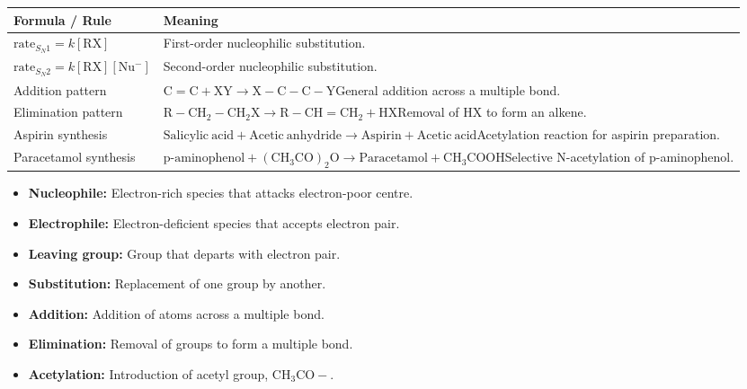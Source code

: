 \documentclass[12pt,a4paper]{article}
\renewcommand{\arraystretch}{1.45}
\begin{document}
\begin{tcolorbox}[formulabox, title={Key Formulas at a Glance}]
{\setlength{\tabcolsep}{4pt}\renewcommand{\arraystretch}{1.65}%
\begin{tabularx}{\linewidth}{|B{3.0cm}|Y|}
\hline
\textbf{Formula / Rule} & \textbf{Meaning} \\
\hline
$\text{rate}_{S_N1}=k[\mathrm{RX}]$ & First-order nucleophilic substitution. \\
\hline
$\text{rate}_{S_N2}=k[\mathrm{RX}][\mathrm{Nu^-}]$ & Second-order nucleophilic substitution. \\
\hline
Addition pattern & $\mathrm{C=C+XY\rightarrow X-C-C-Y}$\newline General addition across a multiple bond. \\
\hline
Elimination pattern & $\mathrm{R-CH_2-CH_2X\rightarrow R-CH=CH_2+HX}$\newline Removal of HX to form an alkene. \\
\hline
Aspirin synthesis & $\mathrm{Salicylic\ acid+Acetic\ anhydride\rightarrow Aspirin+Acetic\ acid}$\newline Acetylation reaction for aspirin preparation. \\
\hline
Paracetamol synthesis & $\mathrm{p\text{-}aminophenol + (CH_3CO)_2O \rightarrow Paracetamol + CH_3COOH}$\newline Selective N-acetylation of p-aminophenol. \\
\hline
\end{tabularx}}
\end{tcolorbox}

\begin{tcolorbox}[defbox, title={One-Line Definitions}]
\begin{itemize}[leftmargin=*, itemsep=2pt, topsep=2pt]
  \item \textbf{Nucleophile:} Electron-rich species that attacks electron-poor centre.
  \item \textbf{Electrophile:} Electron-deficient species that accepts electron pair.
  \item \textbf{Leaving group:} Group that departs with electron pair.
  \item \textbf{Substitution:} Replacement of one group by another.
  \item \textbf{Addition:} Addition of atoms across a multiple bond.
  \item \textbf{Elimination:} Removal of groups to form a multiple bond.
  \item \textbf{Acetylation:} Introduction of acetyl group, $\mathrm{CH_3CO-}$.
\end{itemize}
\end{tcolorbox}
\end{document}
